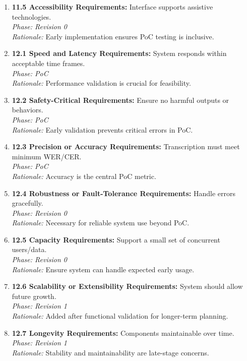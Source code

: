 \documentclass[11pt]{article}
\begin{document}
\begin{enumerate}
    \item \textbf{11.5 Accessibility Requirements:} Interface supports assistive technologies.\\
    \textit{Phase: Revision 0} \\
    \textit{Rationale:} Early implementation ensures PoC testing is inclusive.

    \item \textbf{12.1 Speed and Latency Requirements:} System responds within acceptable time frames.\\
    \textit{Phase: PoC} \\
    \textit{Rationale:} Performance validation is crucial for feasibility.

    \item \textbf{12.2 Safety-Critical Requirements:} Ensure no harmful outputs or behaviors.\\
    \textit{Phase: PoC} \\
    \textit{Rationale:} Early validation prevents critical errors in PoC.

    \item \textbf{12.3 Precision or Accuracy Requirements:} Transcription must meet minimum WER/CER.\\
    \textit{Phase: PoC} \\
    \textit{Rationale:} Accuracy is the central PoC metric.

    \item \textbf{12.4 Robustness or Fault-Tolerance Requirements:} Handle errors gracefully.\\
    \textit{Phase: Revision 0} \\
    \textit{Rationale:} Necessary for reliable system use beyond PoC.

    \item \textbf{12.5 Capacity Requirements:} Support a small set of concurrent users/data.\\
    \textit{Phase: Revision 0} \\
    \textit{Rationale:} Ensure system can handle expected early usage.

    \item \textbf{12.6 Scalability or Extensibility Requirements:} System should allow future growth.\\
    \textit{Phase: Revision 1} \\
    \textit{Rationale:} Added after functional validation for longer-term planning.

    \item \textbf{12.7 Longevity Requirements:} Components maintainable over time.\\
    \textit{Phase: Revision 1} \\
    \textit{Rationale:} Stability and maintainability are late-stage concerns.


\end{enumerate}
\end{document}
